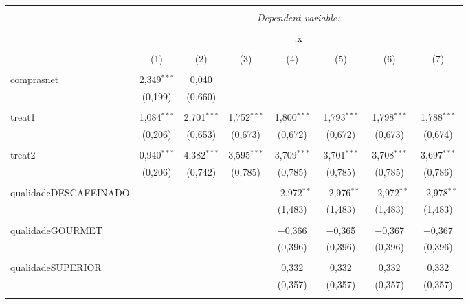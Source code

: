 
\begin{table}[!htbp] \centering 
  \caption{} 
  \label{} 
\begin{tabular}{@{\extracolsep{5pt}}lccccccc} 
\\[-1.8ex]\hline 
\hline \\[-1.8ex] 
 & \multicolumn{7}{c}{\textit{Dependent variable:}} \\ 
\cline{2-8} 
\\[-1.8ex] & \multicolumn{7}{c}{.x} \\ 
\\[-1.8ex] & (1) & (2) & (3) & (4) & (5) & (6) & (7)\\ 
\hline \\[-1.8ex] 
 comprasnet & 2,349$^{***}$ & 0,040 &  &  &  &  &  \\ 
  & (0,199) & (0,660) &  &  &  &  &  \\ 
  & & & & & & & \\ 
 treat1 & 1,084$^{***}$ & 2,701$^{***}$ & 1,752$^{***}$ & 1,800$^{***}$ & 1,793$^{***}$ & 1,798$^{***}$ & 1,788$^{***}$ \\ 
  & (0,206) & (0,653) & (0,673) & (0,672) & (0,672) & (0,673) & (0,674) \\ 
  & & & & & & & \\ 
 treat2 & 0,940$^{***}$ & 4,382$^{***}$ & 3,595$^{***}$ & 3,709$^{***}$ & 3,701$^{***}$ & 3,708$^{***}$ & 3,697$^{***}$ \\ 
  & (0,206) & (0,742) & (0,785) & (0,785) & (0,785) & (0,785) & (0,786) \\ 
  & & & & & & & \\ 
 qualidadeDESCAFEINADO &  &  &  & $-$2,972$^{**}$ & $-$2,976$^{**}$ & $-$2,972$^{**}$ & $-$2,978$^{**}$ \\ 
  &  &  &  & (1,483) & (1,483) & (1,483) & (1,483) \\ 
  & & & & & & & \\ 
 qualidadeGOURMET &  &  &  & $-$0,366 & $-$0,365 & $-$0,367 & $-$0,367 \\ 
  &  &  &  & (0,396) & (0,396) & (0,396) & (0,396) \\ 
  & & & & & & & \\ 
 qualidadeSUPERIOR &  &  &  & 0,332 & 0,332 & 0,332 & 0,332 \\ 
  &  &  &  & (0,357) & (0,357) & (0,357) & (0,357) \\ 
  & & & & & & & \\ 

\end{tabular}
\end{table}
